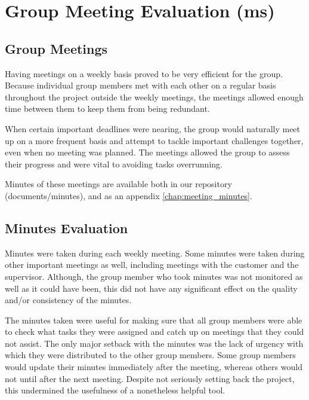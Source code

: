 
\section{Group Meeting Evaluation (ms)}
\label{evaluation meeting}

\subsection{Group Meetings}

Having meetings on a weekly basis proved to be very efficient
for the group. Because individual group members met with 
each other on a regular basis throughout the project outside
the weekly meetings, the meetings allowed enough time 
between them to keep them from being redundant.

When certain important deadlines were nearing, the group
would naturally meet up on a more frequent basis and
attempt to tackle important challenges together, even when
no meeting was planned. The meetings allowed the group 
to assess their progress and were vital to avoiding tasks
overrunning.

Minutes of these meetings are available both in our repository \cite{github} 
(documents/minutes), and as an appendix \ref{chap:meeting_minutes}.

\subsection{Minutes Evaluation}

Minutes were taken during each weekly meeting. 
Some minutes were taken during other important meetings 
as well, including meetings with the customer and the 
supervisor. Although, the group member who took 
minutes was not monitored as well as it could have been, 
this did not have any significant effect on the quality 
and/or consistency of the minutes.

The minutes taken were useful for making sure that
all group members were able to check what tasks
they were assigned and catch up on meetings that they
could not assist. The only major setback with the minutes
was the lack of urgency with which they were distributed
to the other group members. Some group members would
update their minutes immediately after the meeting, whereas 
others would not until after the next meeting. Despite
not seriously setting back the project, this undermined the
usefulness of a nonetheless helpful tool.
